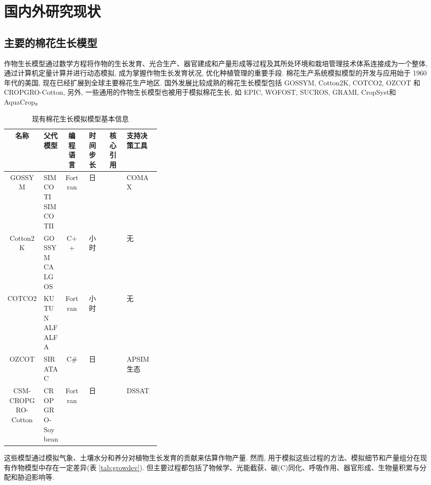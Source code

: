 \documentclass[a4paper,zihao=5]{ctexbook}
\begin{document}
\section{国内外研究现状}
\subsection{主要的棉花生长模型}
作物生长模型通过数学方程将作物的生长发育、光合生产、器官建成和产量形成等过程及其所处环境和栽培管理技术体系连接成为一个整体,
通过计算机定量计算并进行动态模拟, 成为掌握作物生长发育状况, 优化种植管理的重要手段.
棉花生产系统模拟模型的开发与应用始于 1960 年代的美国, 现在已经扩展到全球主要棉花生产地区.
国外发展比较成熟的棉花生长模型包括 GOSSYM\cite{baker1976}, Cotton2K\cite{cotton2kv4}, COTCO2\cite{wall1994}, OZCOT\cite{hearn1994} 和 CROPGRO-Cotton\cite{jones2003},
另外, 一些通用的作物生长模型也被用于模拟棉花生长, 如 EPIC\cite{williams1989}, WOFOST\cite{WOFOST}, SUCROS\cite{vanittersum2003}, GRAMI\cite{ko2005}, CropSyst\cite{sommer2008}和 AquaCrop\cite{steduto2009}。

\begin{table}
    \caption{现有棉花生长模拟模型基本信息}
    \small
    \centering
    \begin{tabular}{cp{0.14\linewidth}cccp{0.22\linewidth}}
        \toprule
        名称               & 父代模型         & 编程语言 & 时间步长 & 核心引用          & 支持决策工具 \\
        \midrule
        GOSSYM             & SIMCOTI SIMCOTII & Fortran  & 日       &                   & COMAX        \\
        Cotton2K           & GOSSYM CALGOS    & C++      & 小时     &                   & 无           \\
        COTCO2             & KUTUN ALFALFA    & Fortran  & 小时     &                   & 无           \\
        OZCOT              & SIRATAC          & C\#      & 日       & \citet{hearn1994} & APSIM 生态   \\
        CSM-CROPGRO-Cotton & CROPGRO-Soybean  & Fortran  & 日       &                   & DSSAT        \\
        \bottomrule
    \end{tabular}
\end{table}

这些模型通过模拟气象、土壤水分和养分对植物生长发育的贡献来估算作物产量.
然而, 用于模拟这些过程的方法、模拟细节和产量组分在现有作物模型中存在一定差异(表 \ref{tab:growdev})\cite{thorp2014}.
但主要过程都包括了物候学、光能截获、碳(C)同化、呼吸作用、器官形成、生物量积累与分配和胁迫影响等.
\end{document}
